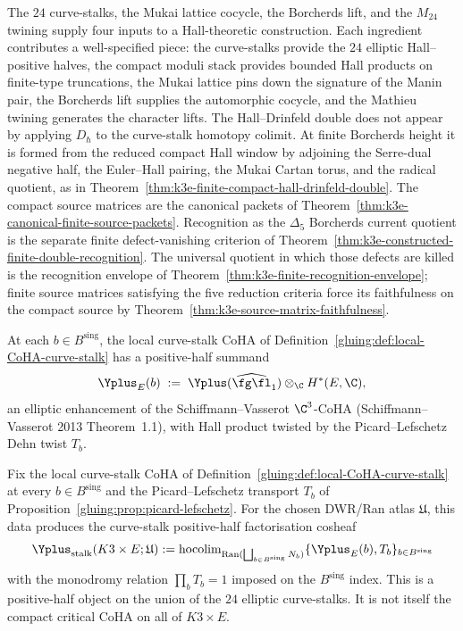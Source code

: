 The $24$ curve-stalks, the Mukai lattice cocycle, the Borcherds lift,
and the $M_{24}$ twining supply four inputs to a Hall-theoretic
construction. Each ingredient contributes a well-specified piece: the
curve-stalks provide the $24$ elliptic Hall--positive halves, the
compact moduli stack provides bounded Hall products on finite-type
truncations, the Mukai lattice pins down the signature of the Manin
pair, the Borcherds lift supplies the automorphic cocycle, and the
Mathieu twining generates the character lifts. The Hall--Drinfeld
double does not appear by applying \(D_\hbar\) to the curve-stalk
homotopy colimit. At finite Borcherds height it is formed from the
reduced compact Hall window by adjoining the Serre-dual negative half,
the Euler--Hall pairing, the Mukai Cartan torus, and the radical
quotient, as in
Theorem~\ref{thm:k3e-finite-compact-hall-drinfeld-double}. The compact
source matrices are the canonical packets of
Theorem~\ref{thm:k3e-canonical-finite-source-packets}. Recognition
as the \(\Delta_5\) Borcherds current quotient is the separate finite
defect-vanishing criterion of
Theorem~\ref{thm:k3e-constructed-finite-double-recognition}. The
universal quotient in which those defects are killed is the recognition
envelope of Theorem~\ref{thm:k3e-finite-recognition-envelope}; finite
source matrices satisfying the five reduction criteria force its
faithfulness on the compact source by
Theorem~\ref{thm:k3e-source-matrix-faithfulness}.

\begin{definition}
\label{gluing:def:elliptic-hall-positive-half}
At each $b \in B^{\mathrm{sing}}$, the local curve-stalk CoHA of
Definition~\ref{gluing:def:local-CoHA-curve-stalk} has a positive-half
summand
\[
 \Yplus_E(b) \;:=\;
 \Yplus(\widehat{\fg\fl}_1) \otimes_\C H^*(E, \C),
\]
an elliptic enhancement of the Schiffmann--Vasserot $\C^3$-CoHA
(Schiffmann--Vasserot 2013 Theorem~1.1), with Hall product twisted
by the Picard--Lefschetz Dehn twist $T_b$.
\end{definition}

\begin{proposition}
\label{gluing:prop:24-assembly}
Fix the local curve-stalk CoHA of
Definition~\ref{gluing:def:local-CoHA-curve-stalk} at every
$b\in B^{\mathrm{sing}}$ and the Picard--Lefschetz transport
$T_b$ of Proposition~\ref{gluing:prop:picard-lefschetz}. For the
chosen DWR/Ran atlas \(\mathfrak U\), this data produces the
curve-stalk positive-half factorisation cosheaf
\[
\Yplus_{\mathrm{stalk}}(K3\times E;\mathfrak U)
 :=
 \mathrm{hocolim}_{\mathrm{Ran}(\bigsqcup_{b\in B^{\mathrm{sing}}}N_b)}
 \{\Yplus_E(b),T_b\}_{b\in B^{\mathrm{sing}}}
\]
with the monodromy relation $\prod_b T_b=1$ imposed on the
$B^{\mathrm{sing}}$ index. This is a positive-half object on the
union of the $24$ elliptic curve-stalks. It is not itself the compact
critical CoHA on all of \(K3\times E\).
\end{proposition}


